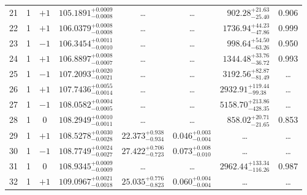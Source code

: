 \begin{table*}[!]
\begin{tabular}{llcrrlrc}
21 & 1 & $+1$ & $    105.1891_{-      0.0008}^{+      0.0009}$ & \multicolumn{1}{c}{\dots} & \multicolumn{1}{c}{\dots} & $      902.28_{-       25.40}^{+       21.63}$ & 0.906\\[1pt]
22 & 1 & $+1$ & $    106.0379_{-      0.0008}^{+      0.0008}$ & \multicolumn{1}{c}{\dots} & \multicolumn{1}{c}{\dots} & $     1736.94_{-       47.86}^{+       44.23}$ & 0.999 \\[1pt]
23 & 1 & $-1$ & $    106.3454_{-      0.0010}^{+      0.0011}$ & \multicolumn{1}{c}{\dots} & \multicolumn{1}{c}{\dots} & $      998.64_{-       63.26}^{+       54.50}$ & 0.950 \\[1pt]
24 & 1 & $+1$ & $    106.8897_{-      0.0007}^{+      0.0008}$ & \multicolumn{1}{c}{\dots} & \multicolumn{1}{c}{\dots} & $     1344.48_{-       36.72}^{+       33.76}$ & 0.993\\[1pt]
25 & 1 & $-1$ & $    107.2093_{-      0.0021}^{+      0.0020}$ & \multicolumn{1}{c}{\dots} & \multicolumn{1}{c}{\dots} & $     3192.56_{-       81.49}^{+       82.87}$ & \dots \\[1pt]
26 & 1 & $+1$ & $    107.7436_{-      0.0014}^{+      0.0055}$ & \multicolumn{1}{c}{\dots} & \multicolumn{1}{c}{\dots} & $     2932.91_{-       99.38}^{+      119.44}$ & \dots \\[1pt]
27 & 1 & $-1$ & $    108.0582_{-      0.0005}^{+      0.0004}$ & \multicolumn{1}{c}{\dots} & \multicolumn{1}{c}{\dots} & $     5158.70_{-      428.35}^{+      213.86}$ & \dots \\[1pt]
28 & 1 & 0 & $    108.2949_{-      0.0011}^{+      0.0010}$ & \multicolumn{1}{c}{\dots} & \multicolumn{1}{c}{\dots} & $      858.02_{-       21.65}^{+       20.71}$ & 0.853 \\[1pt]
29 & 1 & $+1$ & $    108.5278_{-      0.0028}^{+      0.0030}$ & $      22.373_{-       0.934}^{+       0.938}$ & $       0.046_{-       0.004}^{+       0.003}$ & \multicolumn{1}{c}{\dots} & \dots \\[1pt]
30 & 1 & $-1$ & $    108.7749_{-      0.0027}^{+      0.0024}$ & $      27.422_{-       0.723}^{+       0.706}$ & $       0.073_{-       0.010}^{+       0.008}$ & \multicolumn{1}{c}{\dots} & \dots \\[1pt]
31 & 1 & 0 & $    108.9345_{-      0.0009}^{+      0.0009}$ & \multicolumn{1}{c}{\dots} & \multicolumn{1}{c}{\dots} & $     2962.44_{-      116.26}^{+      133.34}$ & 0.987\\[1pt]
32 & 1 & $+1$ & $    109.0967_{-      0.0018}^{+      0.0021}$ & $      25.035_{-       0.823}^{+       0.776}$ & $       0.060_{-       0.004}^{+       0.004}$ & \multicolumn{1}{c}{\dots} & \dots \\[1pt]

\end{tabular}
\end{table*}
